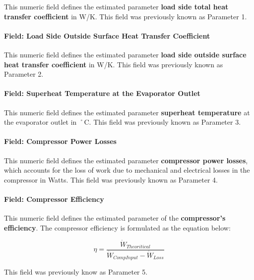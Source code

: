 This numeric field defines the estimated parameter \textbf{load side total heat transfer coefficient} in W/K. This field was previously known as Parameter 1.

\paragraph{Field: Load Side Outside Surface Heat Transfer Coefficient}\label{field-load-side-outside-surface-heat-transfer-coefficient}

This numeric field defines the estimated parameter \textbf{load side outside surface heat transfer coefficient} in W/K. This field was previously known as Parameter 2.

\paragraph{Field: Superheat Temperature at the Evaporator Outlet}\label{field-superheat-temperature-at-the-evaporator-outlet}

This numeric field defines the estimated parameter \textbf{superheat temperature} at the evaporator outlet in ˚C. This field was previously known as Parameter 3.

\paragraph{Field: Compressor Power Losses}\label{field-compressor-power-losses}

This numeric field defines the estimated parameter \textbf{compressor power losses}, which accounts for the loss of work due to mechanical and electrical losses in the compressor in Watts. This field was previously known as Parameter 4.

\paragraph{Field: Compressor Efficiency}\label{field-compressor-efficiency}

This numeric field defines the estimated parameter of the \textbf{compressor's efficiency}. The compressor efficiency is formulated as the equation below:

\begin{equation}
\eta  = \frac{{{{\dot W}_{Theoritical}}}}{{{{\dot W}_{CompInput}} - {{\dot W}_{Loss}}}}
\end{equation}

This field was previously know as Parameter 5.

